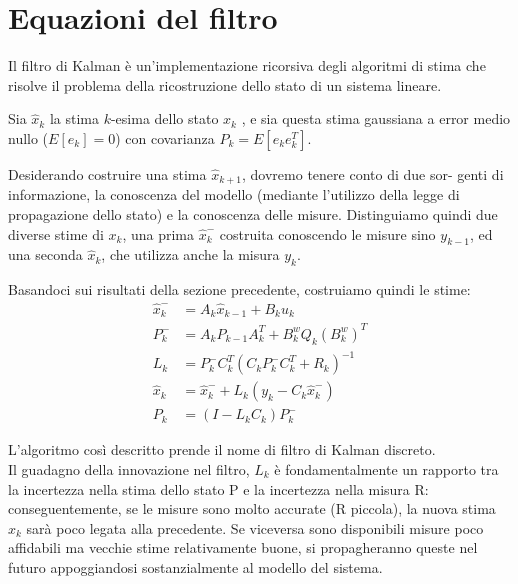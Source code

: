 \section{Equazioni del filtro}

Il filtro di Kalman è un'implementazione ricorsiva degli algoritmi di stima che risolve il problema della ricostruzione dello stato di un sistema lineare.

Sia $\hat{x}_k$ la stima $k$-esima dello stato $x_k$ , e sia questa stima gaussiana a error medio nullo ($E[e_k] = 0$) con covarianza $P_k=E[e_ke_k^T]$.

Desiderando costruire una stima $\hat{x}_{k+1}$, dovremo tenere conto di due sor-
genti di informazione, la conoscenza del modello (mediante l’utilizzo della
legge di propagazione dello stato) e la conoscenza delle misure. Distinguiamo
quindi due diverse stime di $x_k$, una prima $\hat{x}_k^-$ costruita conoscendo le misure sino $y_{k-1}$, ed una seconda $\hat{x}_k$, che utilizza anche la misura $y_{k}$.

Basandoci sui risultati della sezione precedente, costruiamo quindi le stime:
\begin{align}
\hat{x}_k^- &= A_k\hat{x}_{k-1} + B_ku_k \\
P_k^- &= A_kP_{k-1}A_k^T + B^w_kQ_k(B^w_k)^T \\
L_k &= P_k^-C_k^T(C_kP_k^-C_k^T + R_k)^{-1}\\
\hat{x}_k &= \hat{x}_k^- + L_k(y_k - C_k\hat{x}_k^-)\\
P_k &= (I - L_kC_k)P_k^-
\end{align}

L’algoritmo così descritto prende il nome di filtro di Kalman discreto. \\ Il guadagno della innovazione nel filtro, $L_k$ è fondamentalmente un rapporto tra la incertezza nella stima dello stato P e la incertezza nella misura R: conseguentemente, se le misure sono molto accurate (R piccola), la nuova stima $\hat{x}_k$ sarà poco legata alla precedente. Se viceversa sono disponibili misure poco affidabili ma vecchie stime relativamente buone, si propagheranno queste nel futuro appoggiandosi sostanzialmente al modello del sistema.

\newpage
